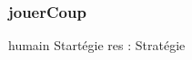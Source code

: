 \subsubsection{jouerCoup}

\begin{algorithme}
\small
\fonction
{humain}
{}
{Startégie}
{res : Stratégie}
{
{}
}
\end{algorithme}
